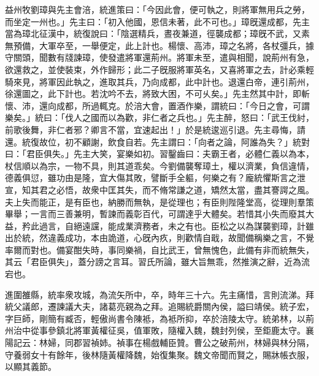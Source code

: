 \begin{pinyinscope}
益州牧劉璋與先主會涪，統進策曰：「今因此會，便可執之，則將軍無用兵之勞，而坐定一州也。」先主曰：「初入他國，恩信未著，此不可也。」璋旣還成都，先主當為璋北征漢中，統復說曰：「陰選精兵，晝夜兼道，徑襲成都；璋旣不武，又素無預備，大軍卒至，一舉便定，此上計也。楊懷、高沛，璋之名將，各杖彊兵，據守關頭，聞數有牋諫璋，使發遣將軍還荊州。將軍未至，遣與相聞，說荊州有急，欲還救之，並使裝束，外作歸形；此二子旣服將軍英名，又喜將軍之去，計必乘輕騎來見，將軍因此執之，進取其兵，乃向成都，此中計也。退還白帝，連引荊州，徐還圖之，此下計也。若沈吟不去，將致大困，不可乆矣。」先主然其中計，即斬懷、沛，還向成都，所過輒克。於涪大會，置酒作樂，謂統曰：「今日之會，可謂樂矣。」統曰：「伐人之國而以為歡，非仁者之兵也。」先主醉，怒曰：「武王伐紂，前歌後舞，非仁者邪？卿言不當，宜速起出！」於是統逡巡引退。先主尋悔，請還。統復故位，初不顧謝，飲食自若。先主謂曰：「向者之論，阿誰為失？」統對曰：「君臣俱失。」先主大笑，宴樂如初。習鑿齒曰：夫霸王者，必體仁義以為本，杖信順以為宗，一物不具，則其道乖矣。今劉備襲奪璋土，權以濟業，負信違情，德義俱愆，雖功由是隆，宜大傷其敗，譬斷手全軀，何樂之有？龐統懼斯言之泄宣，知其君之必悟，故衆中匡其失，而不脩常謙之道，矯然太當，盡其謇諤之風。夫上失而能正，是有臣也，納勝而無執，是從理也；有臣則陛隆堂高，從理則羣策畢舉；一言而三善兼明，暫諫而義彰百代，可謂達乎大體矣。若惜其小失而廢其大益，矜此過言，自絕遠讜，能成業濟務者，未之有也。臣松之以為謀襲劉璋，計雖出於統，然違義成功，本由詭道，心旣內疚，則歡情自戢，故聞備稱樂之言，不覺率爾而對也。備宴酣失時，事同樂禍，自比武王，曾無愧色，此備有非而統無失，其云「君臣俱失」，蓋分謗之言耳。習氏所論，雖大旨無乖，然推演之辭，近為流宕也。

進圍雒縣，統率衆攻城，為流矢所中，卒，時年三十六。先主痛惜，言則流涕。拜統父議郎，遷諫議大夫，諸葛亮親為之拜。追賜統爵關內侯，謚曰靖侯。統子宏，字巨師，剛簡有臧否，輕傲尚書令陳袛，為袛所抑，卒於涪陵太守。統弟林，以荊州治中從事參鎮北將軍黃權征吳，值軍敗，隨權入魏，魏封列侯，至鉅鹿太守。襄陽記云：林婦，同郡習禎姉。禎事在楊戲輔臣贊。曹公之破荊州，林婦與林分隔，守養弱女十有餘年，後林隨黃權降魏，始復集聚。魏文帝聞而賢之，賜牀帳衣服，以顯其義節。


\end{pinyinscope}